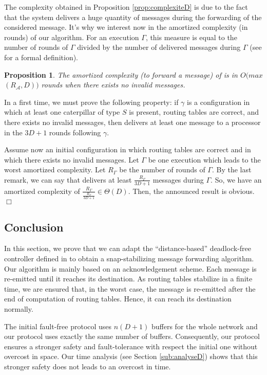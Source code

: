 \documentclass[11pt]{article}
\newtheorem{proposition}{Proposition}
\newenvironment{sketchproof}{{\noindent\bf Sketch of proof. } }{{\hfill $\Box$}}
\begin{document}
The complexity obtained in Proposition \ref{prop:complexiteD} is due to the fact that the system delivers a huge quantity of messages during the forwarding of the considered message. It's why we interest now in the amortized complexity (in rounds) of our algorithm. For an execution $\Gamma$, this measure is equal to the number of rounds of $\Gamma$ divided by the number of delivered messages during $\Gamma$ (see \cite{CLRS02} for a formal definition).

\begin{proposition} \label{prop:amortieD}
The amortized complexity (to forward a message) of \AD is in $O(max$ $(R_{\mathcal{A}},D))$ rounds when there exists no invalid messages.
\end{proposition}

\begin{sketchproof}
In a first time, we must prove the following property: if $\gamma$ is a configuration in which at least one caterpillar of type $S$  is present, routing tables are correct, and there exists no invalid messages, then \AD delivers at least one message to a processor in the $3D+1$ rounds following $\gamma$.

Assume now an initial configuration in which routing tables are correct and in which there exists no invalid messages. Let $\Gamma$ be one execution which leads to the worst amortized complexity. Let $R_{\Gamma}$ be the number of rounds of $\Gamma$. By the last remark, we can say that \AD delivers at
least $\frac{R_{\Gamma}}{3D+1}$ messages during $\Gamma$. So, we have an amortized complexity of $\frac{R_{\Gamma}}{\frac{R_{\Gamma}}{3D+1}}\in\Theta(D)$. Then, the announced result is obvious.
\end{sketchproof}

\subsection{Conclusion}

In this section, we prove that we can adapt the ``distance-based'' deadlock-free controller defined in \cite{MS78} to obtain a snap-stabilizing message forwarding algorithm. Our algorithm is mainly based on an acknowledgement scheme. Each message is re-emitted until it reaches its destination. As routing tables stabilize in a finite time, we are ensured that, in the worst case, the message is re-emitted after the end of computation of routing tables. Hence, it can reach its destination normally.

The initial fault-free protocol uses $n(D+1)$ buffers for the whole network and our protocol uses exactly the same number of buffers. Consequently, our protocol ensures a stronger safety and fault-tolerance with respect the initial one without overcost in space. Our time analysis (see Section \ref{sub:analyseD}) shows that this stronger safety does not leads to an overcost in time.
\end{document}
